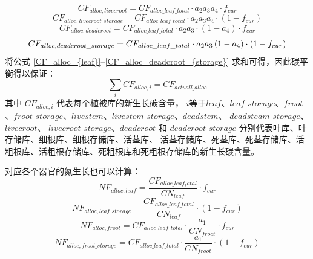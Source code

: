 \begin{equation}
  CF_{alloc,livecroot} = CF_{alloc\_leaf\_total}\cdot a_2a_3a_4\cdot f_{cur}
\end{equation}
\begin{equation}
  CF_{alloc,livecroot\_storage} = CF_{alloc\_leaf\_total}\cdot a_2a_3a_4\cdot \left(1-f_{cur}\right)
\end{equation}
\begin{equation}
  CF_{alloc,deadcroot} = CF_{alloc\_leaf\_total}\cdot a_2a_3\cdot \left(1-a_4\right)\cdot f_{cur}
\end{equation}
\begin{equation}\label{CF_alloc_deadcroot_{storage}}
  CF_{alloc,deadcroot\_storage} = CF_{alloc\_leaf\_total}\cdot a_2a_3\left(1-a_4\right)\cdot \left(1-f_{cur}\right)
\end{equation}
将公式 \eqref{CF_alloc_{leaf}}--\eqref{CF_alloc_deadcroot_{storage}} 求和可得，因此碳平衡得以保证：
\begin{equation}
  \sum_{i}{CF_{alloc,i}}=CF_{actuall\_alloc}
\end{equation}
其中 $CF_{alloc,i}$ 代表每个植被库的新生长碳含量，
$i$等于$leaf$、$leaf\_storage$、$froot$、$froot\_storage$、$livestem$、$livestem\_storage$、$deadstem$、
 $deadsteam\_storage$、$livecroot$、 $livecroot\_storage$、$deadcroot$
 和 $deadcroot\_storage$ 分别代表叶库、叶存储库、细根库、细根存储库、活茎库、
 活茎存储库、死茎库、死茎存储库、活粗根库、活粗根存储库、死粗根库和死粗根存储库的新生长碳含量。


 对应各个器官的氮生长也可以计算：
\begin{equation}\label{eq:NF_alloc_leaf}
  NF_{alloc,leaf} = \frac{CF_{alloc\_leaf_total}}{CN_{leaf}}\cdot f_{cur}
\end{equation}
\begin{equation}
  NF_{alloc,leaf\_storage} = \frac{CF_{alloc\_leaf\_total}}{CN_{leaf}}\cdot \left(1-f_{cur}\right)
\end{equation}
\begin{equation}
  NF_{alloc,froot} = CF_{alloc\_leaf\_total}\cdot \frac{a_1}{CN_{froot}}\cdot f_{cur}
\end{equation}
\begin{equation}
  NF_{alloc,froot\_storage} = CF_{alloc\_leaf\_total}\cdot \frac{a_1}{CN_{froot}}\cdot \left(1-f_{cur}\right)
\end{equation}


